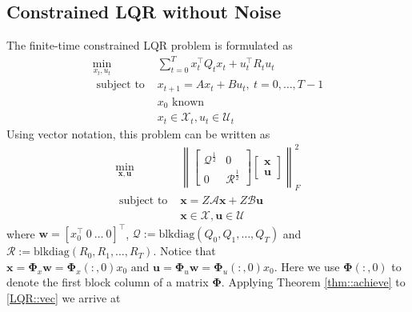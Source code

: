 \documentclass{article}[12pt]
\begin{document}
\subsection{Constrained LQR without Noise}
The finite-time constrained LQR problem is formulated as
\begin{equation}
\label{LQR}
    \begin{aligned} \min _{x_{t}, u_{t}} & \sum_{t=0}^{T} x_{t}^{\top} Q_{t} x_{t}+u_{t}^{\top} R_{t} u_{t} \\ \text { subject to } & x_{t+1}=A x_{t}+B u_{t}, \ t=0, \ldots, T-1 \\ & x_{0} \text { known } \\ & x_{t} \in \mathcal{X}_{t}, u_{t} \in \mathcal{U}_{t} \end{aligned}
\end{equation}
Using vector notation, this problem can be written as
\begin{equation}
\label{LQR::vec}
    \begin{aligned} \min _{\mathbf{x}, \mathbf{u}} &\left\|\left[\begin{array}{cc}{\mathcal{Q}^{\frac{1}{2}}} & {0} \\ {0} & {\mathcal{R}^{\frac{1}{2}}}\end{array}\right]\left[\begin{array}{l}{\mathbf{x}} \\ {\mathbf{u}}\end{array}\right]\right\|_{F}^{2} \\ \text { subject to } & \mathbf{x}=Z \mathcal{A} \mathbf{x}+Z \mathcal{B} \mathbf{u} \\ & \boldsymbol{x} \in \mathcal{X}, \mathbf{u} \in \mathcal{U} \end{aligned}
\end{equation}
where $\mathbf{w}=\left[x_0^\top \ 0 \ \ldots \ 0 \right]^\top$, $\mathcal{Q}:=\text {blkdiag}\left(Q_{0}, Q_{1}, \ldots, Q_{T}\right)$ and $\mathcal{R}:=\text {blkdiag}\left(R_{0}, R_{1}, \ldots, R_{T}\right)$.
Notice that $\mathbf{x}=\mathbf{\Phi}_{x} \mathbf{w}=\mathbf{\Phi}_{x}(:, 0) x_{0} \text { and } \mathbf{u}=\mathbf{\Phi}_{u} \mathbf{w}=\mathbf{\Phi}_{u}(:, 0) x_{0}$. Here we use $\mathbf{\Phi}(:, 0)$ to denote the first block column of a matrix $\mathbf{\Phi}$. Applying Theorem \ref{thm::achieve} to \eqref{LQR::vec} we arrive at
\end{document}
